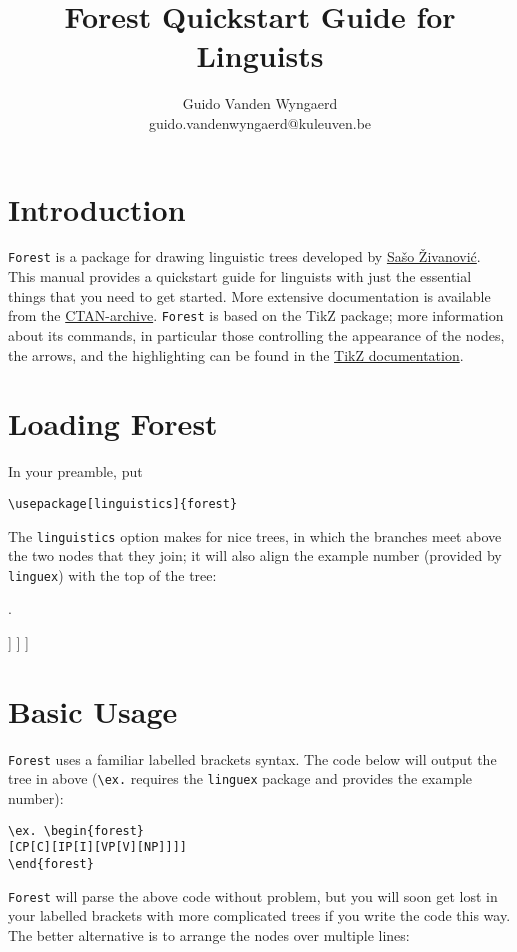 \documentclass[english,12pt]{article}
\title{Forest Quickstart Guide for Linguists}
\author{Guido Vanden Wyngaerd\\
guido.vandenwyngaerd@kuleuven.be}
\begin{document}
\maketitle

\tableofcontents

\section{Introduction}

\texttt{Forest} is a package for drawing linguistic trees developed by \href{http://spj.ff.uni-lj.si/zivanovic/}{Sašo Živanović}. This manual provides a quickstart guide for linguists with just the essential things that you need to get started. More extensive documentation is available from the \href{https://www.ctan.org/pkg/forest}{CTAN-archive}. \texttt{Forest} is based on the TikZ package; more information about its commands, in particular those controlling the appearance of the nodes, the arrows, and the highlighting can be found in the \href{https://sourceforge.net/projects/pgf/}{TikZ documentation}.

\section{Loading Forest}

In your preamble, put \begin{verbatim}
\usepackage[linguistics]{forest}\end{verbatim}
The \texttt{linguistics} option makes for nice trees, in which the branches meet above the two nodes that they join; it will also align the example number (provided by \texttt{linguex}) with the top of the tree:

\ex.\label{1}
\begin{forest}
[CP [C] 
	[IP [I] 
		[VP [V]
			[NP]  
		] 
	] 
]
\end{forest}


\section{Basic Usage}

\texttt{Forest} uses a familiar labelled brackets syntax. The code below will output the tree in \Last above (\verb|\ex.| requires the \texttt{linguex} package and provides the example number):

\begin{lstlisting}[basicstyle=\ttfamily,basewidth=0.5em]
\ex. \begin{forest}
[CP[C][IP[I][VP[V][NP]]]]
\end{forest}
\end{lstlisting}
\texttt{Forest} will parse the above code without problem, but you will soon get lost in your labelled brackets with more complicated trees if you write the code this way. The better alternative is to arrange the nodes over multiple lines:
\end{document}
